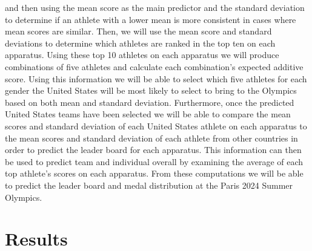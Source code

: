 \documentclass[12pt]{article}
\begin{document}
and then using the 
mean score as the main predictor and the standard deviation to determine if an athlete with a lower 
mean is more consistent in cases where mean scores are similar. Then, we will use the mean score and 
standard deviations to determine which athletes are ranked in the top ten on each apparatus. Using 
these top 10 athletes on each apparatus we will produce combinations of five athletes and calculate 
each combination's expected additive score. Using this information we will be able to select which 
five athletes for each gender the United States will be most likely to select to bring to the Olympics 
based on both mean and standard deviation. Furthermore, once the predicted United States teams have 
been selected we will be able to compare the mean scores and standard deviation of each United States 
athlete on each apparatus to the mean scores and standard deviation of each athlete from other countries 
in order to predict the leader board for each apparatus. This information can then be used to predict 
team and individual overall by examining the average of each top athlete's scores on each apparatus. 
From these computations we will be able to predict the leader board and medal distribution at the Paris 
2024 Summer Olympics.

\section{Results}
\label{sec:res}
\end{document}
